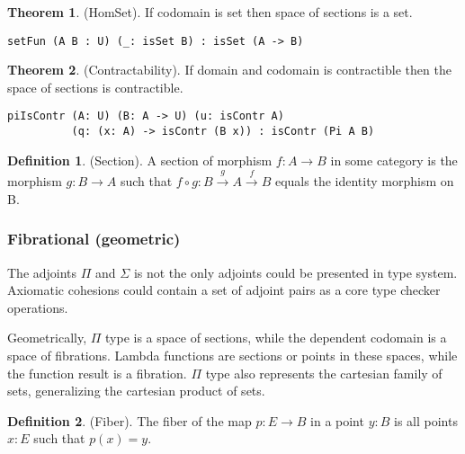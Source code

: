 \documentclass{article}
\theoremstyle{definition}
\newtheorem{theorem}{Theorem}
\newtheorem{definition}{Definition}
\def\mapright#1{\xrightarrow{{#1}}}
\begin{document}
\begin{theorem} (HomSet).
If codomain is set then space of sections is a set.
\begin{lstlisting}
setFun (A B : U) (_: isSet B) : isSet (A -> B)
\end{lstlisting}
\end{theorem}

\begin{theorem} (Contractability).
If domain and codomain is contractible then the space of sections is contractible.
\begin{lstlisting}
piIsContr (A: U) (B: A -> U) (u: isContr A)
          (q: (x: A) -> isContr (B x)) : isContr (Pi A B)
\end{lstlisting}
\end{theorem}

\begin{definition} (Section).
A section of morphism $f: A \rightarrow B$ in some category is the morphism $g: B \rightarrow A$
such that $f \circ g: B \mapright{g} A \mapright{f} B$ equals the identity morphism on B.
\end{definition}

\subsubsection{Fibrational (geometric)}

The adjoints $\Pi$ and $\Sigma$ is not the only adjoints could be presented in type system.
Axiomatic cohesions could contain a set of adjoint pairs as a core type checker operations.

Geometrically, $\Pi$ type is a space of sections, while the dependent codomain is a space of fibrations.
Lambda functions are sections or points in these spaces, while the function result is a fibration.
$\Pi$ type also represents the cartesian family of sets, generalizing the cartesian product of sets.


\begin{definition} (Fiber).
The fiber of the map $p: E \rightarrow B$ in a point $y: B$ is all points $x: E$ such that $p(x)=y$.
\end{definition}
\end{document}
